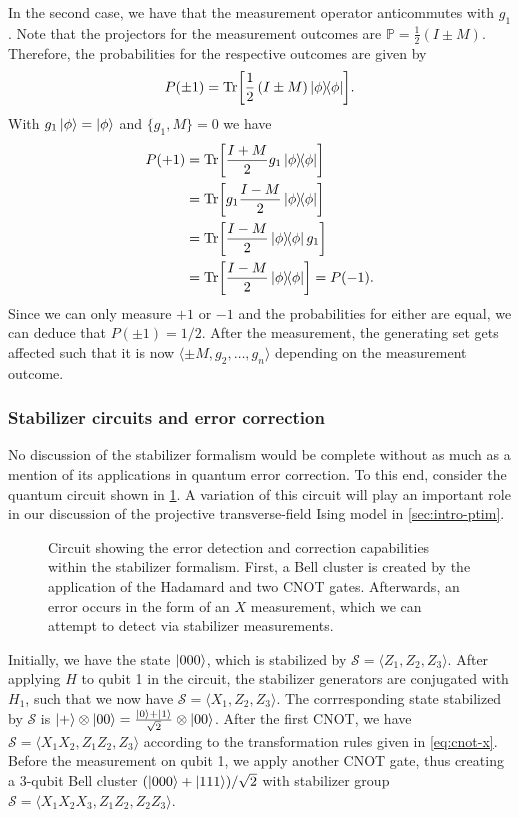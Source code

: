 In the second case, we have that the measurement operator anticommutes with
$g_1$. Note that the projectors for the measurement outcomes are $\mathbb{P} =
\frac{1}{2}\left( I\pm M \right)$. Therefore, the probabilities for the
respective outcomes are given by
\begin{align}
  P(\pm 1) = \Tr[\frac{1}{2}\left( I\pm M \right) \dyad{\phi}]
.\end{align}
With $g_1 \ket{\phi} = \ket{\phi}$ and $\{g_1, M\} =0$ we have
\begin{align}
  P(+1) &= \Tr[\frac{I+M}{2} g_1 \dyad{\phi}] \nonumber\\
        &= \Tr[g_1 \frac{I-M}{2} \dyad{\phi}] \nonumber\\
        &= \Tr[\frac{I-M}{2} \dyad{\phi} g_1] \nonumber\\
        &= \Tr[\frac{I-M}{2} \dyad{\phi}] = P(-1)
.\end{align}
Since we can only measure $+1$ or $-1$ and the probabilities for either are
equal, we can deduce that $P(\pm 1) = 1 / 2$. After the measurement, the
generating set gets affected such that it is now
$\langle \pm M, g_2, \ldots, g_n\rangle$ depending on the measurement outcome.

\subsubsection{Stabilizer circuits and error correction}

No discussion of the stabilizer formalism would be complete without as much as
a mention of its applications in quantum error correction. To this end,
consider the quantum circuit shown in
\cref{fig:error-detection-circuit}. A variation of this circuit will play
an important role in our discussion of the projective transverse-field Ising
model in \cref{sec:intro-ptim}.

\begin{figure}[H]
  \centering
  
  \caption{Circuit showing the error detection and correction capabilities
    within the stabilizer formalism.  First, a Bell cluster is created by the
    application of the Hadamard and two CNOT gates.  Afterwards, an error
    occurs in the form of an $X$ measurement, which we can attempt to detect
    via stabilizer measurements.}
  \label{fig:error-detection-circuit}
\end{figure}

Initially, we have the state $\ket{000}$, which is stabilized by $\mathcal{S} =
\langle Z_1, Z_2, Z_3 \rangle$. After applying $H$ to qubit 1 in the circuit,
the stabilizer generators are
conjugated with $H_1$, such that we now have $\mathcal{S} = \langle X_1, Z_2,
Z_3 \rangle$. The corrresponding state stabilized by $\mathcal{S}$ is
$\ket{+}\otimes\ket{00}=\frac{\ket{0}+\ket{1}}{\sqrt{2}} \otimes \ket{00}$.
After the first CNOT, we have $\mathcal{S} = \langle X_1X_2,Z_1Z_2,Z_3\rangle$
according to the transformation rules given in \cref{eq:cnot-x}. Before the measurement on qubit 1, we
apply another CNOT gate, thus creating a 3-qubit Bell cluster
$(\ket{000}+\ket{111}) / \sqrt{2}$ with stabilizer group $\mathcal{S}= \langle
X_1X_2X_3,Z_1Z_2,Z_2Z_3\rangle$. 


